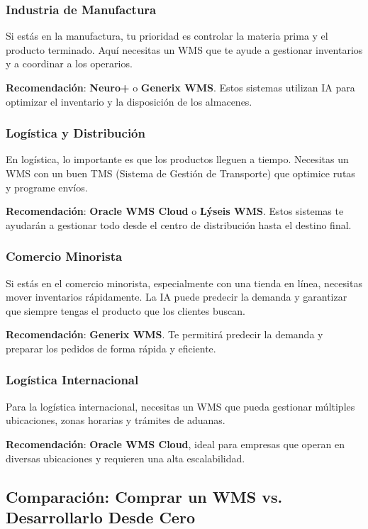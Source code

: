 \subsubsection{Industria de Manufactura}

Si estás en la manufactura, tu prioridad es controlar la materia prima y el producto terminado. Aquí necesitas un WMS que te ayude a gestionar inventarios y a coordinar a los operarios.

\textbf{Recomendación}: \textbf{Neuro+} o \textbf{Generix WMS}. Estos sistemas utilizan IA para optimizar el inventario y la disposición de los almacenes.

\subsubsection{Logística y Distribución}

En logística, lo importante es que los productos lleguen a tiempo. Necesitas un WMS con un buen TMS (Sistema de Gestión de Transporte) que optimice rutas y programe envíos.

\textbf{Recomendación}: \textbf{Oracle WMS Cloud} o \textbf{Lýseis WMS}. Estos sistemas te ayudarán a gestionar todo desde el centro de distribución hasta el destino final.

\subsubsection{Comercio Minorista}

Si estás en el comercio minorista, especialmente con una tienda en línea, necesitas mover inventarios rápidamente. La IA puede predecir la demanda y garantizar que siempre tengas el producto que los clientes buscan.

\textbf{Recomendación}: \textbf{Generix WMS}. Te permitirá predecir la demanda y preparar los pedidos de forma rápida y eficiente.

\subsubsection{Logística Internacional}

Para la logística internacional, necesitas un WMS que pueda gestionar múltiples ubicaciones, zonas horarias y trámites de aduanas.

\textbf{Recomendación}: \textbf{Oracle WMS Cloud}, ideal para empresas que operan en diversas ubicaciones y requieren una alta escalabilidad.

\subsection{Comparación: Comprar un WMS vs. Desarrollarlo Desde Cero}

